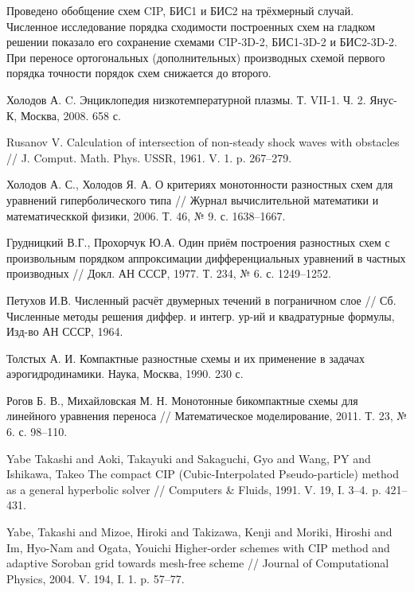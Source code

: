 \documentclass[11pt]{article}
\begin{document}
Проведено обобщение схем CIP, БИС1 и БИС2 на трёхмерный случай.
Численное исследование порядка сходимости построенных схем на гладком решении показало его сохранение схемами
CIP-3D-2, БИС1-3D-2 и БИС2-3D-2.
При переносе ортогональных (дополнительных) производных схемой первого порядка точности порядок схем снижается до второго.

\begin{thebibliography}{99}

Холодов А. C. Энциклопедия низкотемпературной плазмы. Т. VII-1. Ч. 2. Янус-К, Москва, 2008. 658 с.

Rusanov V. Calculation of intersection of non-steady shock waves with obstacles // J. Comput. Math. Phys. USSR, 1961. V. 1. p. 267--279.

Холодов А. С., Холодов Я. А. О критериях монотонности разностных схем для уравнений гиперболического типа // Журнал вычислительной математики и математическкой физики, 2006. Т. 46, № 9. с. 1638--1667.

Грудницкий В.Г., Прохорчук Ю.А. Один приём построения разностных схем с произвольным порядком аппроксимации дифференциальных уравнений в частных производных // Докл. АН СССР, 1977. Т. 234, № 6. с. 1249--1252.

Петухов И.В. Численный расчёт двумерных течений в пограничном слое // Сб.  Численные методы решения диффер. и интегр. ур-ий и квадратурные формулы, Изд-во АН СССР, 1964.

Толстых А. И. Компактные разностные схемы и их применение в задачах аэрогидродинамики. Наука, Москва, 1990. 230 с.

Рогов Б. В., Михайловская М. Н. Монотонные бикомпактные схемы для линейного уравнения переноса // Математическое моделирование, 2011. Т. 23, № 6. с. 98--110.

Yabe Takashi and Aoki, Takayuki and Sakaguchi, Gyo and Wang, PY and Ishikawa, Takeo The compact CIP (Cubic-Interpolated Pseudo-particle) method as a general hyperbolic solver // Computers \& Fluids, 1991. V. 19, I. 3--4. p. 421--431.

Yabe, Takashi and Mizoe, Hiroki and Takizawa, Kenji and Moriki, Hiroshi and Im, Hyo-Nam and Ogata, Youichi  Higher-order schemes with CIP method and adaptive Soroban grid towards mesh-free scheme // Journal of Computational Physics, 2004. V. 194, I. 1. p. 57--77.


\end{thebibliography}
\end{document}
